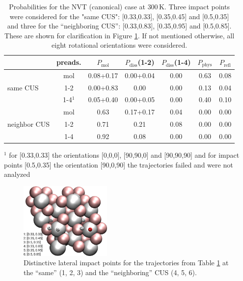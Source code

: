 \documentclass[11pt,DIV=13,BCOR=5mm,a4paper,headinclude]{scrbook}
\begin{document}
\begin{table}[hbt]
 \centering
  \caption{
  Probabilities for the NVT (canonical) case at $300\,$K.
Three impact points were considered for the "same CUS": [0.33,0.33], [0.35,0.45] and [0.5,0.35]  and three for the ``neighboring CUS'': [0.33,0.83], [0.35,0.95] and [0.5,0.85].
These are shown for clarification in Figure \ref{fig:impact}.
If not mentioned otherwise, all eight rotational orientations were considered.}
 \begin{tabular}{l|c|ccccc}
\toprule
& preads. &$P_\textrm{mol}$ & $P_\textrm{diss}$(1-2) &  $P_\textrm{diss}$(1-4) & $P_\textrm{phys}$ & $P_\textrm{refl}$ \\\midrule
\multirow{3}{*}{same CUS}& mol &0.08+0.17 & 0.00+0.04 & 0.00 &  0.63 & 0.08 \\
& 1-2 &0.00+0.83 & 0.00 & 0.00 &  0.13 & 0.04 \\
& 1-4$^1$ &0.05+0.40 & 0.00+0.05 & 0.00 & 0.40 & 0.10 \\\midrule
\multirow{3}{*}{neighbor CUS}& mol &0.63 & 0.17+0.17 & 0.04  & 0.00 & 0.00 \\
& 1-2 & 0.71 & 0.21 & 0.08& 0.00 & 0.00\\
& 1-4 & 0.92 & 0.08 & 0.00 & 0.00 & 0.00\\\bottomrule
\end{tabular}
\begin{tablenotes}
 \footnotesize
\item[] $^1$ for [0.33,0.33] the orientations [0,0,0], [90,90,0] and [90,90,90] and for impact points [0.5,0.35] the orientation [90,0,90] the trajectories failed and were not analyzed
\end{tablenotes}
 \label{tab:enh_can}
\end{table}
\begin{figure}[!h]
 \centering
 \includegraphics[width=0.4\textwidth]{figures/0001/points_same_other.png}
 \caption{Distinctive lateral impact points for the trajectories from Table \ref{tab:enh_can} at the ``same'' (1, 2, 3) and the ``neighboring'' CUS (4, 5, 6).}
 \label{fig:impact}
 \end{figure}
\end{document}

